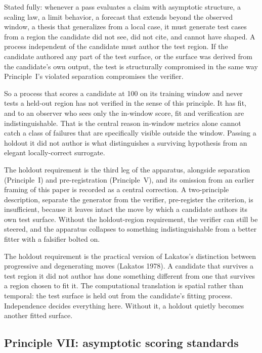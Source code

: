 \documentclass[
  11pt,
]{article}
\begin{document}
Stated fully: whenever a pass evaluates a claim with asymptotic
structure, a scaling law, a limit behavior, a forecast that extends
beyond the observed window, a thesis that generalizes from a local case, it must generate test cases from a region the candidate did not see, did
not cite,
and cannot have shaped. A process independent of the candidate must author
the test region. If the candidate authored any part of the test surface,
or the surface was derived from the candidate's own output, the test is
structurally compromised in the same way Principle~I's violated separation
compromises the verifier.

So a process that scores a candidate at 100 on its training window and
never tests a held-out region has not verified in the sense of this
principle. It has fit, and to an observer who sees only the in-window
score, fit and verification are indistinguishable. That is the central
reason in-window metrics alone cannot catch a class of failures that are
specifically visible outside the window. Passing a holdout it did not
author is what distinguishes a surviving hypothesis from an elegant
locally-correct surrogate.

The holdout requirement is the third leg of the apparatus, alongside
separation (Principle~I) and pre-registration (Principle~V), and its
omission from an earlier framing of this paper is recorded as a central
correction. A two-principle description, separate the generator from
the verifier, pre-register the criterion, is insufficient, because it leaves
intact the move by which a candidate authors its own test surface. Without
the holdout-region requirement, the verifier can still be steered, and the
apparatus collapses to something indistinguishable from a better fitter
with a falsifier bolted on.

The holdout requirement is the practical version of Lakatos's distinction
between progressive and degenerating moves (Lakatos 1978). A candidate
that survives a test region it did not author has done something different
from one that survives a region chosen to fit it. The computational
translation is spatial rather than temporal: the test surface is held out
from the candidate's fitting process. Independence decides everything
here. Without it, a holdout quietly becomes another fitted surface.

\subsection{Principle VII: asymptotic scoring
standards}\label{principle-vii-asymptotic-scoring-standards}
\end{document}
